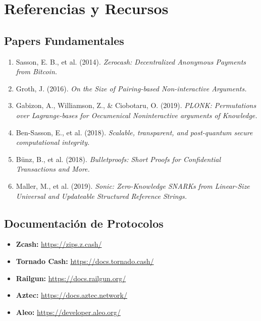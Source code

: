 \documentclass[11pt,a4paper,twoside]{book}
\theoremstyle{definition}
\theoremstyle{remark}
\renewcommand{\cleardoublepage}{\clearpage}
\begin{document}
\cleardoublepage

\listoffigures
{}

\cleardoublepage

\listoftables
{}

\cleardoublepage

\chapter*{Referencias y Recursos}

\section*{Papers Fundamentales}

\begin{enumerate}
    \item Sasson, E. B., et al. (2014). \textit{Zerocash: Decentralized Anonymous Payments from Bitcoin.}
    \item Groth, J. (2016). \textit{On the Size of Pairing-based Non-interactive Arguments.}
    \item Gabizon, A., Williamson, Z., \& Ciobotaru, O. (2019). \textit{PLONK: Permutations over Lagrange-bases for Oecumenical Noninteractive arguments of Knowledge.}
    \item Ben-Sasson, E., et al. (2018). \textit{Scalable, transparent, and post-quantum secure computational integrity.}
    \item Bünz, B., et al. (2018). \textit{Bulletproofs: Short Proofs for Confidential Transactions and More.}
    \item Maller, M., et al. (2019). \textit{Sonic: Zero-Knowledge SNARKs from Linear-Size Universal and Updateable Structured Reference Strings.}
\end{enumerate}

\section*{Documentación de Protocolos}

\begin{itemize}
    \item \textbf{Zcash:} \url{https://zips.z.cash/}
    \item \textbf{Tornado Cash:} \url{https://docs.tornado.cash/}
    \item \textbf{Railgun:} \url{https://docs.railgun.org/}
    \item \textbf{Aztec:} \url{https://docs.aztec.network/}
    \item \textbf{Aleo:} \url{https://developer.aleo.org/}
\end{itemize}
\end{document}
